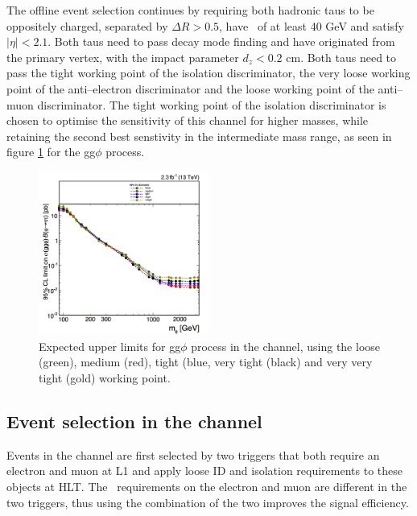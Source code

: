 The offline event selection continues by requiring both hadronic taus to be oppositely charged, separated
by $\Delta R > 0.5$, have \pT~of at least 40 GeV and satisfy $|\eta|<2.1$. Both taus need
to pass decay mode finding and have originated from the primary vertex, with the impact parameter $d_{z} < 0.2$ cm. 
Both taus need to pass the tight working point of the isolation discriminator, the very loose 
working point of the anti--electron discriminator and the loose working point of the anti--muon discriminator. 
The tight working point of the isolation discriminator is chosen to optimise the sensitivity
of this channel for higher masses, while retaining the second best senstivity in the intermediate
mass range, as seen in figure \ref{fig:mssm_tauid_tt} for the gg$\phi$ process.
\begin{figure}[h!]
\begin{center}
\includegraphics[width=0.5\textwidth]{./MSSM/Figures/ggh_tt_isolation.png}
\end{center}
\caption{Expected upper limits for gg$\phi$ process in the \tautau channel, using the 
loose (green), medium (red), tight (blue, very tight (black) and very very tight (gold)
working point.}
\label{fig:mssm_tauid_tt}
\end{figure}

\subsection{\texorpdfstring{Event selection in the \emu channel}{Event selection in the e mu channel}}
\label{sec:mssm_eventsel_em}
Events in the \emu channel are first selected by two triggers
that both require an electron and muon at \ac{L1} and apply loose ID and
isolation requirements to these objects at \ac{HLT}. The \pT~requirements on
the electron and muon are different in the two triggers, thus using the combination of the two
improves the signal efficiency.


